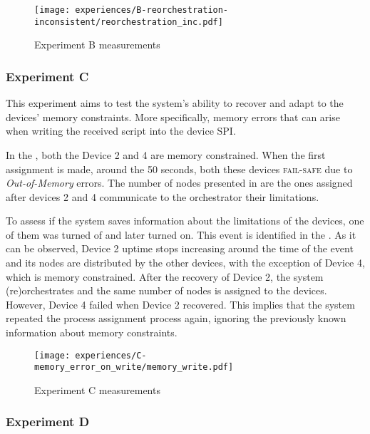 \begin{figure}[h]
\centering
\texttt{[image: experiences/B-reorchestration-inconsistent/reorchestration\_inc.pdf]}
\caption[Experiment B measurements]{Experiment B measurements}\label{fig:experiment_b_graph}
\end{figure}


\subsubsection{Experiment C}

This experiment aims to test the system's ability to recover and adapt to the devices' memory constraints. More specifically, memory errors that can arise when writing the received script into the device SPI.

In the , both the Device 2 and 4 are memory constrained. When the first assignment is made, around the 50 seconds, both these devices \textsc{fail-safe} due to \textit{Out-of-Memory} errors. The number of nodes presented in  are the ones assigned after devices 2 and 4 communicate to the orchestrator their limitations. 

To assess if the system saves information about the limitations of the devices, one of them was turned of and later turned on. This event is identified in the . As it can be observed, Device 2 uptime stops increasing around the time of the event and its nodes are distributed by the other devices, with the exception of Device 4, which is memory constrained. 
After the recovery of Device 2, the system (re)orchestrates and the same number of nodes is assigned to the devices. However, Device 4 failed when Device 2 recovered. This implies that the system repeated the process assignment process again, ignoring the previously known information about memory constraints.

\begin{figure}[h]
\centering
\texttt{[image: experiences/C-memory\_error\_on\_write/memory\_write.pdf]}
\caption[Experiment C measurements]{Experiment C measurements}\label{fig:experiment_c_graph}
\end{figure}


\subsubsection{Experiment D}

